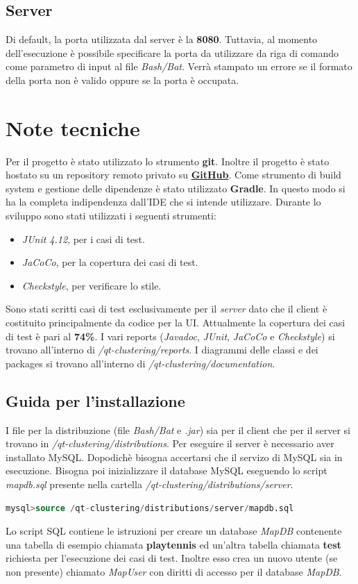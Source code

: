 \documentclass{article}
\begin{document}
	\subsection{Server}
	Di default, la porta utilizzata dal server è la \textbf{8080}.
	Tuttavia, al momento dell'esecuzione è possibile specificare
	la porta da utilizzare da riga di comando come parametro di
	input al file \textit{Bash/Bat}. Verrà stampato un errore
	se il formato della porta non è valido oppure se la porta è
	occupata.

	\section{Note tecniche}
	Per il progetto è stato utilizzato lo strumento \textbf{git}. Inoltre
	il progetto è stato hostato su un repository remoto privato su
	\href{https://github.com}{\textbf{GitHub}}. Come strumento di build
	system e gestione delle dipendenze è stato utilizzato \textbf{Gradle}.
	In questo modo si ha la completa indipendenza dall'IDE che si intende
	utilizzare. 
	Durante lo sviluppo sono stati utilizzati i seguenti strumenti:
	\begin{itemize}
		\item \textit{JUnit 4.12}, per i casi di test.
		\item \textit{JaCoCo}, per la copertura dei casi di test.
		\item \textit{Checkstyle}, per verificare lo stile.
	\end{itemize}
	Sono stati scritti casi di test esclusivamente per il \textit{server}
	dato che il client è costituito principalmente da codice per la UI.	
	Attualmente la copertura dei casi di test è pari al \textbf{74\%}.
	I vari reports (\textit{Javadoc}, \textit{JUnit}, \textit{JaCoCo} e
	\textit{Checkstyle}) si trovano all'interno di
	\textit{/qt-clustering/reports}.
	I diagrammi delle classi e dei packages si trovano all'interno di
	\textit{/qt-clustering/documentation}.

	\subsection {Guida per l'installazione}
	I file per la distribuzione (file \textit{Bash/Bat} e
	\textit{.jar}) sia per il client che per il server si trovano in
	\textit{/qt-clustering/distributions}.
	Per eseguire il server è necessario aver installato MySQL.
	Dopodichè bisogna accertarsi che il servizo di MySQL sia in
	esecuzione. Bisogna poi inizializzare il database MySQL eseguendo lo
	script \textit{mapdb.sql} presente nella cartella
	\textit{/qt-clustering/distributions/server}.
	\begin{lstlisting}[language=SQL, frame=single]
mysql>source /qt-clustering/distributions/server/mapdb.sql
	\end{lstlisting}
	Lo script SQL contiene le istruzioni per creare un database \textit{MapDB}
	contenente una tabella di esempio chiamata \textbf{playtennis}
	ed un'altra tabella chiamata \textbf{test} richiesta per
	l'esecuzione dei casi di test. Inoltre esso crea un nuovo utente
	(se non presente) chiamato \textit{MapUser} con diritti di accesso
	per il database \textit{MapDB}.
\end{document}
